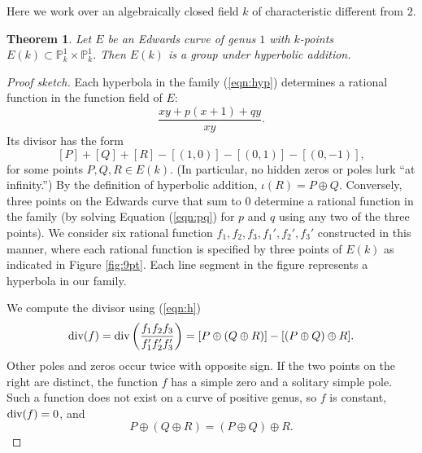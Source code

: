 \documentclass[12pt]{article}
\newtheorem{theorem}{Theorem}[subsection]
\newcommand{\ring}[1]{\mathbb{#1}}
\newcommand{\op}[1]{\hbox{#1}}
\begin{document}
Here we work over an algebraically closed field $k$ of characteristic
different from $2$.

\begin{theorem} Let $E$ be an Edwards curve of genus $1$ with
  $k$-points $E(k)\subset \ring{P}_k^1\times \ring{P}_k^1$.  Then
  $E(k)$ is a group under hyperbolic addition.
\end{theorem}

\begin{proof}[Proof sketch] 
  Each hyperbola in the family (\ref{eqn:hyp}) determines a rational
  function in the function field of $E$:
\[
\frac{x y + p (x+1) + q y}{x y}.
\]
Its divisor has the form
\begin{equation}\label{eqn:h}
[P] + [Q] + [R] - [(1,0)] - [(0,1)] - [(0,-1)],
\end{equation}
for some points $P,Q,R\in E(k)$.  (In particular, no  hidden zeros or
poles lurk ``at infinity.'')  By the definition of hyperbolic
addition, $\iota(R) = P\oplus Q$.  Conversely, three points on the Edwards
curve that sum to $0$ determine a rational function in the family (by solving
Equation (\ref{eqn:pq}) for $p$ and $q$ using any two of the three points). We
consider six rational function $f_1,f_2,f_3,f_1',f_2',f_3'$
constructed in this manner, where each rational function is specified
by three points of $E(k)$ as indicated in Figure {\ref{fig:9pt}}.  Each line
segment in the figure represents a hyperbola in our family.

We compute the divisor using (\ref{eqn:h})
\[
\op{div} (f) =\op{div}\left(\frac{f_1 f_2 f_3}{f_1' f_2' f_3'}\right) = 
[P\oplus (Q\oplus R)] - [(P\oplus Q) \oplus R].
\]
Other poles and zeros occur twice with opposite sign.
If the two points on the right are distinct, the function $f$ has a
simple zero and a solitary simple pole.  Such a function does not
exist on a curve of positive genus, so $f$ is constant, $\op{div}(f)=0$, and
\[
P\oplus (Q\oplus R) = (P\oplus Q) \oplus R.
\]
\end{proof}
\end{document}
